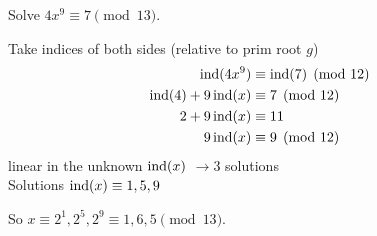     \begin{example}
        Solve $4x^9\equiv 7\pmod{13}$. 

        Take indices of both sides (relative to prim root $g$)
        \begin{align*}
            \operatorname{ind}(4x^9) &\equiv \operatorname{ind}(7)\pmod{12} \\
            \operatorname{ind}(4)+9\operatorname{ind}(x) &\equiv 7\pmod{12} \\
            2+9\operatorname{ind}(x) &\equiv 11 \\
            9\operatorname{ind}(x) &\equiv 9\pmod{12}
        \end{align*}
        linear in the unknown $\operatorname{ind}(x)$ $\rightarrow 3$ solutions \\
        Solutions $\operatorname{ind}(x)\equiv 1,5,9$ 

        So $x\equiv 2^1,2^5,2^9\equiv 1,6,5\pmod{13}$.
    \end{example}